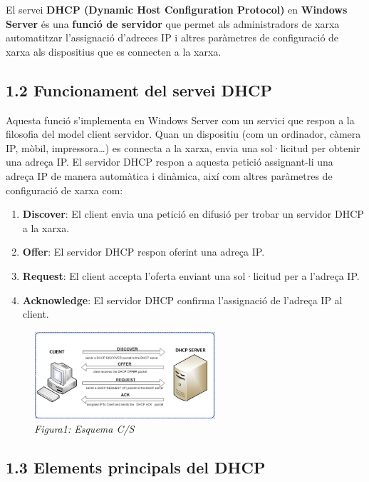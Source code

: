 \documentclass[
  a4paper,
]{article}
\providecommand{\tightlist}{%
  \setlength{\itemsep}{0pt}\setlength{\parskip}{0pt}}
\begin{document}
El servei \textbf{DHCP (Dynamic Host Configuration Protocol)} en
\textbf{Windows Server} és una \textbf{funció de servidor} que permet
als administradors de xarxa automatitzar l'assignació d'adreces IP i
altres paràmetres de configuració de xarxa als dispositius que es
connecten a la xarxa.

\subsection{1.2 Funcionament del servei
DHCP}\label{funcionament-del-servei-dhcp}

Aquesta funció s'implementa en Windows Server com un servici que respon
a la filosofia del model client servidor. Quan un dispositiu (com un
ordinador, càmera IP, mòbil, impressora\ldots) es connecta a la xarxa,
envia una sol·licitud per obtenir una adreça IP. El servidor DHCP respon
a aquesta petició assignant-li una adreça IP de manera automàtica i
dinàmica, així com altres paràmetres de configuració de xarxa com:

\begin{enumerate}
\def\labelenumi{\arabic{enumi}.}
\tightlist
\item
  \textbf{Discover}: El client envia una petició en difusió per trobar
  un servidor DHCP a la xarxa.
\item
  \textbf{Offer}: El servidor DHCP respon oferint una adreça IP.
\item
  \textbf{Request}: El client accepta l'oferta enviant una sol·licitud
  per a l'adreça IP.
\item
  \textbf{Acknowledge}: El servidor DHCP confirma l'assignació de
  l'adreça IP al client.
\end{enumerate}

\begin{figure}
\centering
\includegraphics[width=0.6\textwidth,height=\textheight]{png/DHCPesquema.jpg}
\caption{\emph{Figura1: Esquema C/S}}
\end{figure}

\subsection{1.3 Elements principals del
DHCP}\label{elements-principals-del-dhcp}
\end{document}
